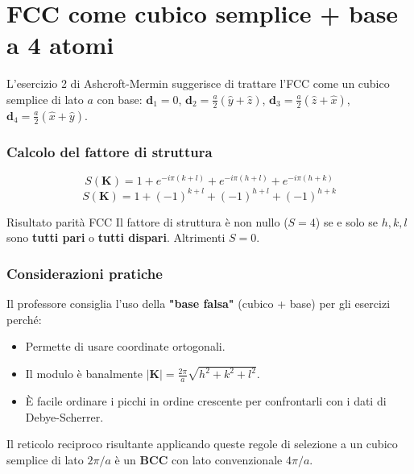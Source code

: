 \section{FCC come cubico semplice + base a 4 atomi}

L'esercizio 2 di Ashcroft-Mermin suggerisce di trattare l'FCC come un cubico semplice di lato $a$ con base:
$\mathbf{d}_1 = 0$, $\mathbf{d}_2 = \frac{a}{2}(\hat{y}+\hat{z})$, $\mathbf{d}_3 = \frac{a}{2}(\hat{z}+\hat{x})$, $\mathbf{d}_4 = \frac{a}{2}(\hat{x}+\hat{y})$.

\subsubsection{Calcolo del fattore di struttura}

\begin{equation}
    S(\mathbf{K}) = 1 + e^{-i\pi(k+l)} + e^{-i\pi(h+l)} + e^{-i\pi(h+k)}
\end{equation}
\begin{equation}
    S(\mathbf{K}) = 1 + (-1)^{k+l} + (-1)^{h+l} + (-1)^{h+k}
\end{equation}

\begin{definizione}{Risultato parità FCC}
    Il fattore di struttura è non nullo ($S=4$) se e solo se $h, k, l$ sono \textbf{tutti pari} o \textbf{tutti dispari}. Altrimenti $S=0$. 
\end{definizione}

\subsubsection{Considerazioni pratiche}

Il professore consiglia l'uso della \textbf{"base falsa"} (cubico + base) per gli esercizi perché:
\begin{itemize}
    \item Permette di usare coordinate ortogonali.
    \item Il modulo è banalmente $|\mathbf{K}| = \frac{2\pi}{a}\sqrt{h^2+k^2+l^2}$.
    \item È facile ordinare i picchi in ordine crescente per confrontarli con i dati di Debye-Scherrer.
\end{itemize}

\begin{nota}
    Il reticolo reciproco risultante applicando queste regole di selezione a un cubico semplice di lato $2\pi/a$ è un \textbf{BCC} con lato convenzionale $4\pi/a$.
\end{nota}

